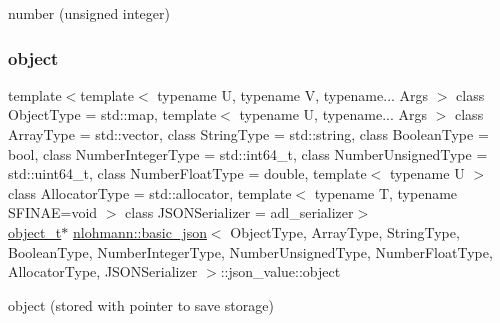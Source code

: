 number (unsigned integer) 

\mbox{\label{unionnlohmann_1_1basic__json_1_1json__value_a4a2209bb26e7088cd36bf24824ab5521}} 
\subsubsection{\texorpdfstring{object}{object}}
{\footnotesize\ttfamily template$<$template$<$ typename U, typename V, typename... Args $>$ class Object\+Type = std\+::map, template$<$ typename U, typename... Args $>$ class Array\+Type = std\+::vector, class String\+Type  = std\+::string, class Boolean\+Type  = bool, class Number\+Integer\+Type  = std\+::int64\+\_\+t, class Number\+Unsigned\+Type  = std\+::uint64\+\_\+t, class Number\+Float\+Type  = double, template$<$ typename U $>$ class Allocator\+Type = std\+::allocator, template$<$ typename T, typename S\+F\+I\+N\+A\+E=void $>$ class J\+S\+O\+N\+Serializer = adl\+\_\+serializer$>$ \\
\hyperlink{classnlohmann_1_1basic__json_a5e48a7893520e1314bf0c9723e26ea2a}{object\+\_\+t}$\ast$ \hyperlink{classnlohmann_1_1basic__json}{nlohmann\+::basic\+\_\+json}$<$ Object\+Type, Array\+Type, String\+Type, Boolean\+Type, Number\+Integer\+Type, Number\+Unsigned\+Type, Number\+Float\+Type, Allocator\+Type, J\+S\+O\+N\+Serializer $>$\+::json\+\_\+value\+::object}



object (stored with pointer to save storage) 

\mbox{\label{unionnlohmann_1_1basic__json_1_1json__value_a9856fb4271b50d738e14c5a9a2f05118}} 

